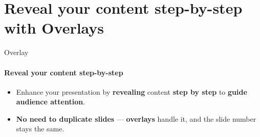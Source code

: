 \documentclass[aspectratio=169]{beamer}
\begin{document}
\section{Reveal your content step-by-step with \textbf{Overlays}}

\begin{frame}
    \agenda     
\end{frame}

\begin{frame}{Overlay}
    \framesubtitle{Reveal your content step-by-step}

    \begin{coloredblockicon}
        \begin{itemize}
            \item \footnotesize Enhance your presentation by \textbf{revealing} content \textbf{step by step} to \textbf{guide audience attention}.
            \item \footnotesize \textbf{No need to duplicate slides} — \textbf{overlays} handle it, and the slide number stays the same.
        \end{itemize}
    \end{coloredblockicon}


\end{frame}
\end{document}
